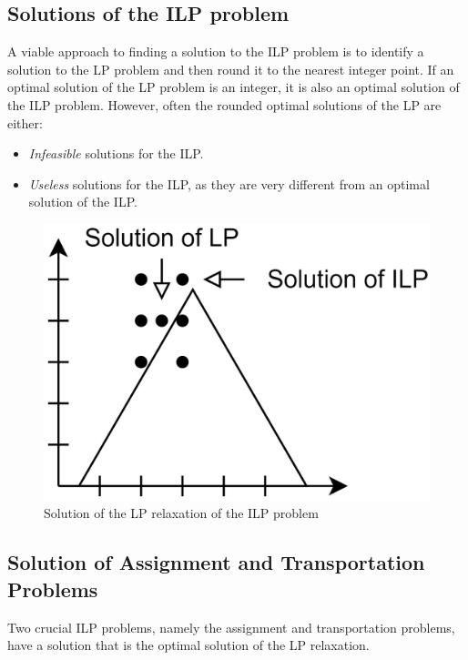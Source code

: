 \subsection{Solutions of the ILP problem}
A viable approach to finding a solution to the ILP problem is to identify a solution to the LP problem and then round it to the nearest integer point.
If an optimal solution of the LP problem is an integer, it is also an optimal solution of the ILP problem. 
However, often the rounded optimal solutions of the LP are either:
\begin{itemize}
    \item \textit{Infeasible} solutions for the ILP.
    \item \textit{Useless} solutions for the ILP, as they are very different from an optimal solution of the ILP.
\end{itemize}
\begin{figure}[H]
    \centering
    \includegraphics[width=0.25\linewidth]{images/ilp2.png}
    \caption{Solution of the LP relaxation of the ILP problem}
\end{figure}

\subsection{Solution of Assignment and Transportation Problems}
Two crucial ILP problems, namely the assignment and transportation problems, have a solution that is the optimal solution of the LP relaxation.

